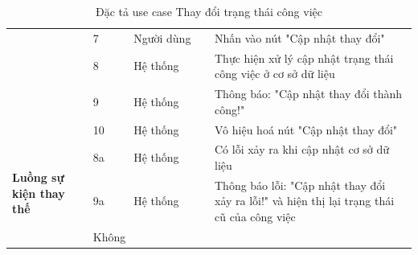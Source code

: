 \documentclass[../DoAn.tex]{subfiles}
\begin{document}
\begin{table}[ht]
\begin{tabular}{| p{0.2\linewidth} | p{0.1\linewidth} | p{0.2\linewidth} | p{0.5\linewidth} |}
                                                                     & \multicolumn{1}{p{0.1\linewidth}|}{7}                                                          & \multicolumn{1}{p{0.2\linewidth}|}{Người dùng}             & \multicolumn{1}{p{0.5\linewidth}|}{Nhấn vào nút "Cập nhật thay đổi"}                                                           \\ \cline{2-4}
                                                                     & \multicolumn{1}{p{0.1\linewidth}|}{8}                                                          & \multicolumn{1}{p{0.2\linewidth}|}{Hệ thống}               & \multicolumn{1}{p{0.5\linewidth}|}{Thực hiện xử lý cập nhật trạng thái công việc ở cơ sở dữ liệu}                              \\ \cline{2-4}
                                                                     & \multicolumn{1}{p{0.1\linewidth}|}{9}                                                          & \multicolumn{1}{p{0.2\linewidth}|}{Hệ thống}               & \multicolumn{1}{p{0.5\linewidth}|}{Thông báo: "Cập nhật thay đổi thành công!"}                                                 \\ \cline{2-4}
                                                                     & \multicolumn{1}{p{0.1\linewidth}|}{10}                                                         & \multicolumn{1}{p{0.2\linewidth}|}{Hệ thống}               & \multicolumn{1}{p{0.5\linewidth}|}{Vô hiệu hoá nút "Cập nhật thay đổi"}                                                        \\ \hline

        \multirow{4}{\linewidth}{\textbf{Luồng sự kiện thay thế}}    & \multicolumn{1}{p{0.1\linewidth}|}{8a}                                                         & \multicolumn{1}{p{0.2\linewidth}|}{Hệ thống}               & \multicolumn{1}{p{0.5\linewidth}|}{Có lỗi xảy ra khi cập nhật cơ sở dữ liệu}                                                   \\ \cline{2-4}
                                                                     & \multicolumn{1}{p{0.1\linewidth}|}{9a}                                                         & \multicolumn{1}{p{0.2\linewidth}|}{Hệ thống}               & \multicolumn{1}{p{0.5\linewidth}|}{Thông báo lỗi: "Cập nhật thay đổi xảy ra lỗi!" và hiện thị lại trạng thái cũ của công việc} \\ \hline

        \textbf{Hậu điều kiện}                                       & \multicolumn{3}{p{0.1\linewidth}|}{Không}                                                                                                                                                                                                                                                    \\ \hline
    \end{tabular}%
    \renewcommand{\arraystretch}{1}
    \caption{Đặc tả use case Thay đổi trạng thái công việc}
    \label{tab:UC03}
\end{table}
\end{document}
